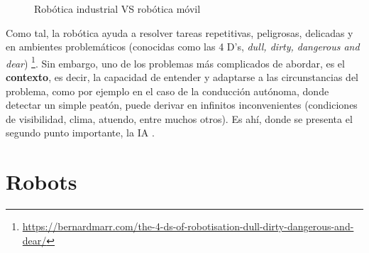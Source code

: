 \begin{figure} [h]
	\centering
	\quad
	\quad
	\caption{Robótica industrial VS robótica móvil}
	\label{fig:industrial_vs_mobile}
\end{figure}

Como tal, la robótica ayuda a resolver tareas repetitivas, peligrosas, delicadas y en ambientes problemáticos (conocidas como las 4 D's, \emph{dull, dirty, dangerous and dear}) \footnote[5]{\url{https://bernardmarr.com/the-4-ds-of-robotisation-dull-dirty-dangerous-and-dear/}}. Sin embargo, uno de los problemas más complicados de abordar, es el \textbf{contexto}, es decir, la capacidad de entender y adaptarse a las circunstancias del problema, como por ejemplo en el caso de la conducción autónoma, donde detectar un simple peatón, puede derivar en infinitos inconvenientes (condiciones de visibilidad, clima, atuendo, entre muchos otros). Es ahí, donde se presenta el segundo punto importante, la \ac{IA} \cite{dworakowski2020robots}.\\

\section{Robots}
\label{sec:robots}

